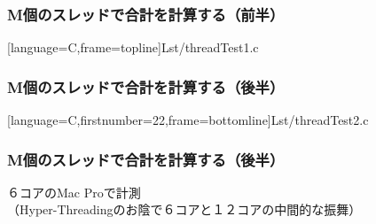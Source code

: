 \documentclass[dvipdfmx]{beamer}
\begin{document}
\begin{frame}[fragile]
  \frametitle{M個のスレッドで合計を計算する（前半）}
  
      [language={C},frame=topline]{Lst/threadTest1.c}
\end{frame}

\begin{frame}[fragile]
  \frametitle{M個のスレッドで合計を計算する（後半）}
  
      [language={C},firstnumber=22,frame=bottomline]{Lst/threadTest2.c}
\end{frame}

\begin{frame}[fragile]
  \frametitle{M個のスレッドで合計を計算する（後半）}
  ６コアのMac Proで計測\\
  （Hyper-Threadingのお陰で６コアと１２コアの中間的な振舞）
\end{frame}
\end{document}
